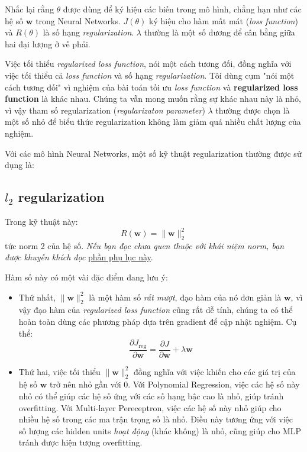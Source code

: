 Nhắc lại rằng $\theta$ được dùng để ký hiệu các biến trong mô hình, chẳng hạn như các hệ số $\mathbf{w}$ trong Neural Networks. $J(\theta)$ ký hiệu cho hàm mất mát (\textit{loss function}) và $R(\theta)$ là số hạng \textit{regularization}. $\lambda$ thường là một số dương để cân bằng giữa hai đại lượng ở vế phải. 
 
 
Việc tối thiểu \textit{regularized loss function}, nói một cách tương đối, đồng nghĩa với việc tối thiểu cả \textit{loss function} và số hạng \textit{regularization}. Tôi dùng cụm "nói một cách tương đối" vì nghiệm của bài toán tối ưu \textit{loss function} và \textbf{regularized loss function} là khác nhau.  Chúng ta vẫn mong muốn rằng sự khác nhau này là nhỏ, vì vậy tham số regularization (\textit{regularizaton parameter}) $\lambda$ thường được chọn là một số nhỏ để biểu thức regularization không làm giảm quá nhiều chất lượng của nghiệm. 
 
Với các mô hình Neural Networks, một số kỹ thuật regularization thường được sử dụng là: 
 
 
\subsection{$l_2$ regularization}
Trong kỹ thuật này: 
\begin{equation*} 
R(\mathbf{w}) = \|\mathbf{w}\|_2^2 
\end{equation*} 
tức norm 2 của hệ số. 
\textit{Nếu bạn đọc chưa quen thuộc với khái niệm norm, bạn được khuyến khích đọc} \href{http://machinelearningcoban.com/math/#-norms-chuan}{phần phụ lục này}.
 
Hàm số này có một vài đặc điểm đang lưu ý: 
 
\begin{itemize}
    \item Thứ nhất, $\|\mathbf{w}\|_2^2$ là một hàm số \textit{rất mượt}, đạo hàm của nó đơn giản là $\mathbf{w}$, vì vậy đạo hàm của \textit{regularized loss function} cũng rất dễ tính, chúng ta có thể hoàn toàn dùng các phương pháp dựa trên gradient để cập nhật nghiệm. Cụ thể: 
    \begin{equation*} 
    \frac{\partial J_{\text{reg}} }{\partial \mathbf{w}} = \frac{\partial J}{\partial \mathbf{w}} + \lambda \mathbf{w} 
    \end{equation*} 
    \item Thứ hai, việc tối thiểu $\|\mathbf{w}\|_2^2$ đồng nghĩa với việc khiến cho các giá trị của hệ số $\mathbf{w}$ trở nên nhỏ gần với 0. Với Polynomial Regression, việc các hệ số này nhỏ có thể giúp các hệ số ứng với các số hạng bậc cao là nhỏ, giúp tránh overfitting. Với Multi-layer Pereceptron, việc các hệ số này nhỏ giúp cho nhiều hệ số trong các ma trận trọng số là nhỏ. Điều này tương ứng với việc số lượng các hidden units \textit{hoạt động} (khác không) là nhỏ, cũng giúp cho MLP tránh được hiện tượng overfitting. 
\end{itemize}
 
